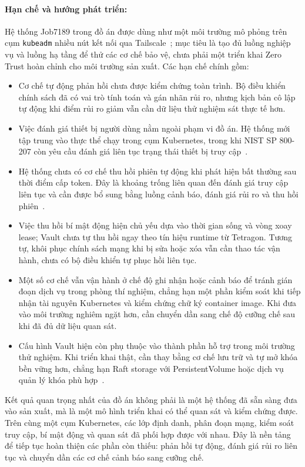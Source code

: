 \paragraph{Hạn chế và hướng phát triển:}
Hệ thống Job7189 trong đồ án được dùng như một môi trường mô phỏng trên cụm \texttt{kubeadm} nhiều nút kết nối qua Tailscale~\parencite{kubeadm_docs,tailscale_docs}; mục tiêu là tạo đủ luồng nghiệp vụ và luồng hạ tầng để thử các cơ chế bảo vệ, chưa phải một triển khai Zero Trust hoàn chỉnh cho môi trường sản xuất. Các hạn chế chính gồm:
\begin{itemize}
    \item Cơ chế tự động phản hồi chưa được kiểm chứng toàn trình. Bộ điều khiển chính sách đã có vai trò tính toán và gán nhãn rủi ro, nhưng kịch bản cô lập tự động khi điểm rủi ro giảm vẫn cần dữ liệu thử nghiệm sát thực tế hơn.
    \item Việc đánh giá thiết bị người dùng nằm ngoài phạm vi đồ án. Hệ thống mới tập trung vào thực thể chạy trong cụm Kubernetes, trong khi NIST SP 800-207 còn yêu cầu đánh giá liên tục trạng thái thiết bị truy cập~\parencite{nist800207,cisa_ztmm2023}.
    \item Hệ thống chưa có cơ chế thu hồi phiên tự động khi phát hiện bất thường sau thời điểm cấp token. Đây là khoảng trống liên quan đến đánh giá truy cập liên tục và cần được bổ sung bằng luồng cảnh báo, đánh giá rủi ro và thu hồi phiên~\parencite{openid_caep,microsoft_aitm}.
    \item Việc thu hồi bí mật động hiện chủ yếu dựa vào thời gian sống và vòng xoay lease; Vault chưa tự thu hồi ngay theo tín hiệu runtime từ Tetragon. Tương tự, khôi phục chính sách mạng khi bị sửa hoặc xóa vẫn cần thao tác vận hành, chưa có bộ điều khiển tự phục hồi liên tục.
    \item Một số cơ chế vẫn vận hành ở chế độ ghi nhận hoặc cảnh báo để tránh gián đoạn dịch vụ trong phòng thí nghiệm, chẳng hạn một phần kiểm soát khi tiếp nhận tài nguyên Kubernetes và kiểm chứng chữ ký container image. Khi đưa vào môi trường nghiêm ngặt hơn, cần chuyển dần sang chế độ cưỡng chế sau khi đã đủ dữ liệu quan sát.
    \item Cấu hình Vault hiện còn phụ thuộc vào thành phần hỗ trợ trong môi trường thử nghiệm. Khi triển khai thật, cần thay bằng cơ chế lưu trữ và tự mở khóa bền vững hơn, chẳng hạn Raft storage với PersistentVolume hoặc dịch vụ quản lý khóa phù hợp~\parencite{vault_docs}.
\end{itemize}

Kết quả quan trọng nhất của đồ án không phải là một hệ thống đã sẵn sàng đưa vào sản xuất, mà là một mô hình triển khai có thể quan sát và kiểm chứng được. Trên cùng một cụm Kubernetes, các lớp định danh, phân đoạn mạng, kiểm soát truy cập, bí mật động và quan sát đã phối hợp được với nhau. Đây là nền tảng để tiếp tục hoàn thiện các phần còn thiếu: phản hồi tự động, đánh giá rủi ro liên tục và chuyển dần các cơ chế cảnh báo sang cưỡng chế.
